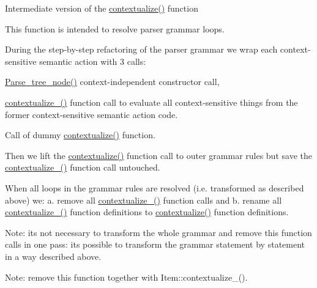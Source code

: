 Intermediate version of the \mbox{\hyperlink{classParse__tree__node_a22d93524a537d0df652d7efa144f23da}{contextualize()}} function

This function is intended to resolve parser grammar loops.

During the step-\/by-\/step refactoring of the parser grammar we wrap each context-\/sensitive semantic action with 3 calls\+:
\begin{DoxyEnumerate}
\item \mbox{\hyperlink{classParse__tree__node}{Parse\+\_\+tree\+\_\+node()}} context-\/independent constructor call,
\item \mbox{\hyperlink{classParse__tree__node_ac8f1179a43a65742a342cad21a93aa0e}{contextualize\+\_\+()}} function call to evaluate all context-\/sensitive things from the former context-\/sensitive semantic action code.
\item Call of dummy \mbox{\hyperlink{classParse__tree__node_a22d93524a537d0df652d7efa144f23da}{contextualize()}} function.
\end{DoxyEnumerate}

Then we lift the \mbox{\hyperlink{classParse__tree__node_a22d93524a537d0df652d7efa144f23da}{contextualize()}} function call to outer grammar rules but save the \mbox{\hyperlink{classParse__tree__node_ac8f1179a43a65742a342cad21a93aa0e}{contextualize\+\_\+()}} function call untouched.

When all loops in the grammar rules are resolved (i.\+e. transformed as described above) we\+: a. remove all \mbox{\hyperlink{classParse__tree__node_ac8f1179a43a65742a342cad21a93aa0e}{contextualize\+\_\+()}} function calls and b. rename all \mbox{\hyperlink{classParse__tree__node_ac8f1179a43a65742a342cad21a93aa0e}{contextualize\+\_\+()}} function definitions to \mbox{\hyperlink{classParse__tree__node_a22d93524a537d0df652d7efa144f23da}{contextualize()}} function definitions.

Note\+: it\textquotesingle{}s not necessary to transform the whole grammar and remove this function calls in one pass\+: it\textquotesingle{}s possible to transform the grammar statement by statement in a way described above.

Note\+: remove this function together with Item\+::contextualize\+\_\+(). \mbox{\label{classParse__tree__node_a3e43a52bddede2f3ffd34257a8863c85}} 
